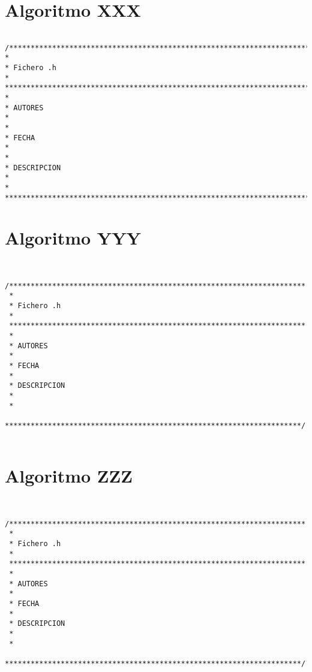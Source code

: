 \section{Algoritmo XXX}
\label{Apendice1:XXX}

\begin{lstlisting}

/**********************************************************************
*
* Fichero .h
*
***********************************************************************
*
* AUTORES
*   
*
* FECHA
*   
*
* DESCRIPCION
*   
*
***********************************************************************/

\end{lstlisting}

\section{Algoritmo YYY}
\label{Apendice1:YYY}

\begin{lstlisting}


/*********************************************************************
 *
 * Fichero .h
 *
 *********************************************************************
 *
 * AUTORES
 *
 * FECHA
 *
 * DESCRIPCION
 *
 *
 *********************************************************************/
 
\end{lstlisting}

\section{Algoritmo ZZZ}
\label{Apendice1:ZZZ}

\begin{lstlisting}


/*********************************************************************
 *
 * Fichero .h
 *
 *********************************************************************
 *
 * AUTORES
 *
 * FECHA
 *
 * DESCRIPCION
 *
 *
 *********************************************************************/
 
\end{lstlisting}

